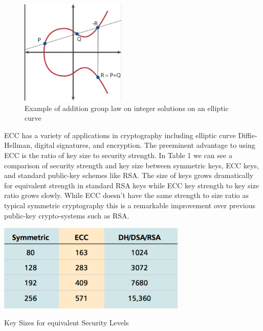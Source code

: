  \begin{figure}[t]
	\centering
	\includegraphics[width=5cm,height=0.5\textheight,keepaspectratio]{./figures/figure_1}
	\caption[font=footnote]{Example of addition group law on integer solutions on an elliptic curve}
\end{figure}

ECC has a variety of applications in cryptography including elliptic curve Diffie-Hellman, digital signatures, and encryption. The preeminent advantage to using ECC is the ratio of key size to security strength. In Table 1 we can see a comparison of security strength and key size between symmetric keys, ECC keys,  and standard public-key schemes like RSA. The size of keys grows dramatically for equivalent strength in standard RSA keys while ECC key strength to key size ratio grows slowly. While ECC doesn't have the same strength to size ratio as typical symmetric cryptography this is a remarkable improvement over previous public-key crypto-systems such as RSA.

 \begin{table}[t]
	\centering
	\includegraphics[width=9cm,height=0.5\textheight,keepaspectratio]{./figures/table_1}
	\center\caption[font=footnote]{Key Sizes for equivalent Security Levels}
\end{table}
	
